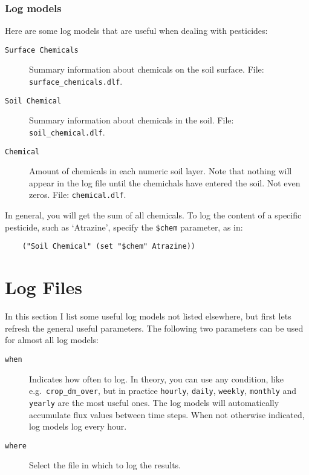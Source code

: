 \documentclass[a4paper,11pt]{article}
\begin{document}

\subsubsection{Log models}

Here are some log models that are useful when dealing with pesticides:
\begin{description}
\item[\texttt{Surface Chemicals}] Summary information about chemicals
  on the soil surface. File: \texttt{surface\_chemicals.dlf}.
\item[\texttt{Soil Chemical}] Summary information about chemicals in
  the soil.  File: \texttt{soil\_chemical.dlf}. 
\item[\texttt{Chemical}] Amount of chemicals in each numeric soil
  layer.  Note that nothing will appear in the log file until the
  chemichals have entered the soil.  Not even zeros.  File:
  \texttt{chemical.dlf}.
\end{description}

In general, you will get the sum of all chemicals.  To log the content
of a specific pesticide, such as `Atrazine', specify the \verb|$chem|%
parameter, as in:
\begin{verbatim}
    ("Soil Chemical" (set "$chem" Atrazine))
\end{verbatim}%

\section{Log Files}
\label{sec:output}

In this section I list some useful log models not listed elsewhere,
but first lets refresh the general useful parameters.  The following
two parameters can be used for almost all log models:
\begin{description}
\item[\texttt{when}] Indicates how often to log.  In theory, you can
  use any condition, like e.g.\ \texttt{crop\_dm\_over}, but in
  practice \texttt{hourly}, \texttt{daily}, \texttt{weekly},
  \texttt{monthly} and \texttt{yearly} are the most useful ones.  The
  log models will automatically accumulate flux values between time
  steps.  When not otherwise indicated, log models log every hour.
\item[\texttt{where}] Select the file in which to log the results.
\end{description}
\end{document}
